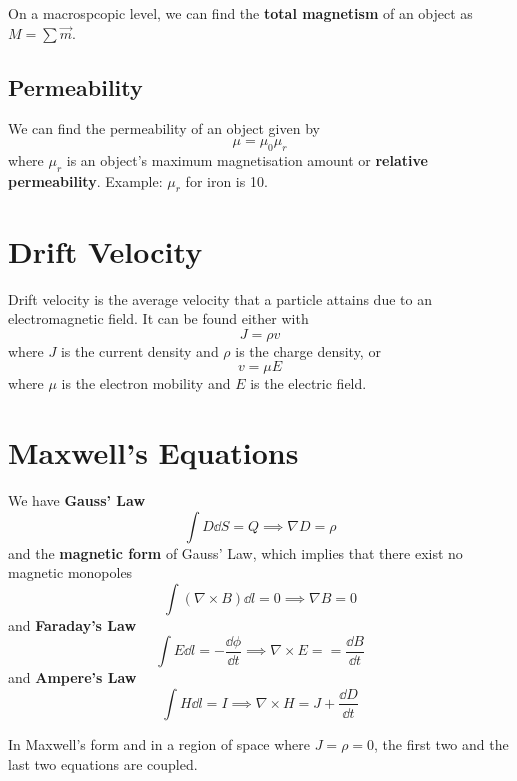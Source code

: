 \documentclass[12pt]{article}
\newcommand{\inint}[2]{\int #1 \dd #2}
\begin{document}
On a macrospcopic level, we can find the {\bf total magnetism} of an object as $M = \sum \vec{m}$.

\subsection*{Permeability}
We can find the permeability of an object given by \[ \mu = \mu_0 \mu_r \] where $\mu_r$ is an object's maximum magnetisation amount or {\bf relative permeability}. Example: $\mu_r$ for iron is 10.

\section*{Drift Velocity}
Drift velocity is the average velocity that a particle attains due to an electromagnetic field. It can be found either with \[ J = \rho v \] where $J$ is the current density and $\rho$ is the charge density, or \[ v = \mu E \] where $\mu$ is the electron mobility and $E$ is the electric field.

\section*{Maxwell's Equations}
We have {\bf Gauss' Law} \[ \inint{D}{S} = Q \implies \nabla D = \rho \] and the {\bf magnetic form} of Gauss' Law, which implies that there exist no magnetic monopoles \[ \inint{(\nabla \times B)}{l} = 0 \implies \nabla B = 0 \] and {\bf Faraday's Law} \[ \inint{E}{l} = -\frac{\dd \phi}{\dd t} \implies \nabla \times E = =\frac{\dd B}{\dd t} \] and {\bf Ampere's Law} \[ \inint{H}{l} = I \implies \nabla \times H = J + \frac{\dd D}{\dd t} \]

In Maxwell's form and in a region of space where $J = \rho = 0$, the first two and the last two equations are coupled.
\end{document}
